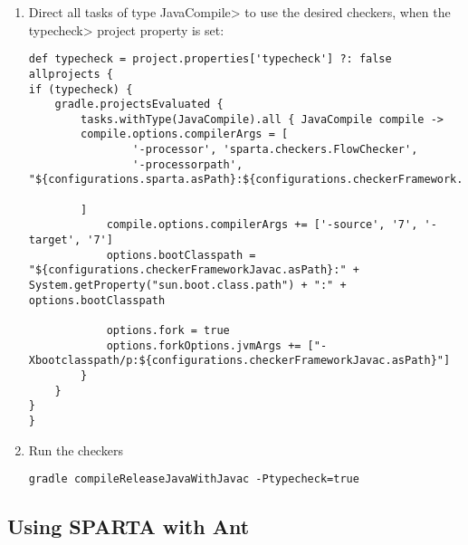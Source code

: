 \begin{enumerate}
\begin{small}
\begin{Verbatim}
}
\end{Verbatim}
\end{small}

\item Direct all tasks of type \<JavaCompile> to use the desired checkers, when the \<typecheck> project property is set:

\begin{small}
\begin{Verbatim}
def typecheck = project.properties['typecheck'] ?: false
allprojects {
if (typecheck) {
    gradle.projectsEvaluated {
        tasks.withType(JavaCompile).all { JavaCompile compile ->
        compile.options.compilerArgs = [
                '-processor', 'sparta.checkers.FlowChecker',
                '-processorpath', "${configurations.sparta.asPath}:${configurations.checkerFramework.asPath}",

        ]
            compile.options.compilerArgs += ['-source', '7', '-target', '7']
            options.bootClasspath = "${configurations.checkerFrameworkJavac.asPath}:" + System.getProperty("sun.boot.class.path") + ":" + options.bootClasspath

            options.fork = true
            options.forkOptions.jvmArgs += ["-Xbootclasspath/p:${configurations.checkerFrameworkJavac.asPath}"]
        }
    }
}
}

\end{Verbatim}
\end{small}

\item Run the checkers

\begin{Verbatim}
gradle compileReleaseJavaWithJavac -Ptypecheck=true
\end{Verbatim}

\end{enumerate}



\subsection{Using SPARTA with Ant\label{install-ant}}

